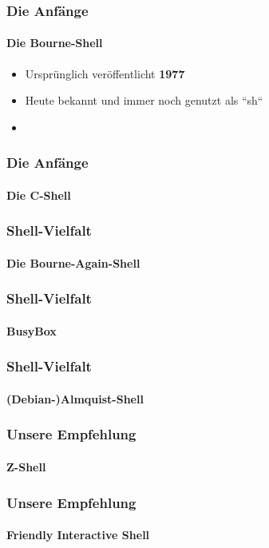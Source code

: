 \documentclass[12pt,utf8]{beamer}
\begin{document}
	\begin{frame}
	\frametitle{Die Anfänge}
	\framesubtitle{Die Bourne-Shell}
	\begin{itemize}
		\item Ursprünglich veröffentlicht \textbf{1977}
		\item Heute bekannt und immer noch genutzt als ``sh``
		\item 
	\end{itemize}
	\end{frame}

	\begin{frame}
	\frametitle{Die Anfänge}
	\framesubtitle{Die C-Shell}
	\end{frame}

	\begin{frame}
	\frametitle{Shell-Vielfalt}
	\framesubtitle{Die Bourne-Again-Shell}
	\end{frame}
	
	\begin{frame}
	\frametitle{Shell-Vielfalt}
	\framesubtitle{BusyBox}
	\end{frame}

	\begin{frame}
	\frametitle{Shell-Vielfalt}
	\framesubtitle{(Debian-)Almquist-Shell}
	\end{frame}

	\begin{frame}
	\frametitle{Unsere Empfehlung}
	\framesubtitle{Z-Shell}
	\end{frame}

	\begin{frame}
	\frametitle{Unsere Empfehlung}
	\framesubtitle{Friendly Interactive Shell}
	\end{frame}
\end{document}
